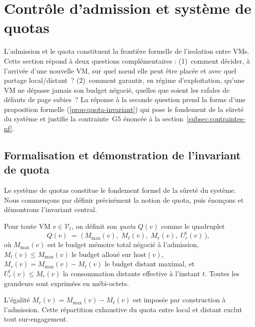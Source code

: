 \section{Contrôle d'admission et système de quotas}
\label{sec:quotas}

L'admission et le quota constituent la frontière formelle de l'isolation entre VMs. Cette section répond à deux questions complémentaires : (1)~comment décider, à l'arrivée d'une nouvelle VM, sur quel nœud elle peut être placée et avec quel partage local/distant~? (2)~comment garantir, en régime d'exploitation, qu'une VM ne dépasse jamais son budget négocié, quelles que soient les rafales de défauts de page subies~? La réponse à la seconde question prend la forme d'une proposition formelle (\autoref{prop:quota-invariant}) qui pose le fondement de la sûreté du système et justifie la contrainte~G5 énoncée à la section~\ref{subsec:contraintes-nf}.

\subsection{Formalisation et démonstration de l'invariant de quota}
\label{subsec:invariant-quota}

Le système de quotas constitue le fondement formel de la sûreté du système. Nous commençons par définir précisément la notion de quota, puis énonçons et démontrons l'invariant central.

\begin{definition}
    \label{def:quota}
    Pour toute VM $v \in \mathcal{V}_t$, on définit son \emph{quota} $Q(v)$ comme le quadruplet
    \[
        Q(v) \;=\; \bigl(\, M_{\max}(v),\; M_{\ell}(v),\; M_r(v),\; U_r^t(v) \,\bigr),
    \]
    où $M_{\max}(v)$ est le budget mémoire total négocié à l'admission, $M_{\ell}(v) \leq M_{\max}(v)$ le budget alloué sur $\mathrm{host}(v)$, $M_r(v) = M_{\max}(v) - M_{\ell}(v)$ le budget distant maximal, et $U_r^t(v) \leq M_r(v)$ la consommation distante effective à l'instant $t$. Toutes les grandeurs sont exprimées en mébi-octets.
\end{definition}

L'égalité $M_r(v) = M_{\max}(v) - M_{\ell}(v)$ est imposée par construction à l'admission. Cette répartition exhaustive du quota entre local et distant exclut tout sur-engagement.

